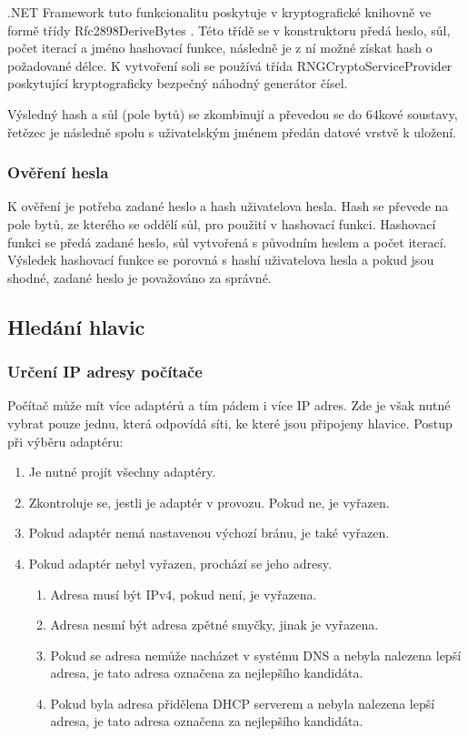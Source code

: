 \documentclass[thesis=B,czech]{FITthesis}[2012/10/20]
\begin{document}
.NET Framework tuto funkcionalitu poskytuje v kryptografické knihov\-ně ve formě třídy Rfc2898DeriveBytes \cite{rfc}. Této třídě se v konstruktoru předá heslo, sůl, počet iterací a jméno hashovací funkce, následně je z ní možné získat hash o požadované délce. K vytvoření soli se používá třída RNGCryptoServiceProvider \cite{rng} poskytující kryptograficky bezpečný náhodný generátor čísel.

Výsledný hash a sůl (pole bytů) se zkombinují a převedou se do 64kové soustavy, řetězec je následně spolu s uživatelským jménem předán datové vrstvě k uložení.


\subsubsection{Ověření hesla}

K ověření je potřeba zadané heslo a hash uživatelova hesla. Hash se převede na pole bytů, ze kterého se oddělí sůl, pro použití v hashovací funkci. Hashovací funkci se předá zadané heslo, sůl vytvořená s původním heslem a počet iterací. Výsledek hashovací funkce se porovná s hashí uživatelova hesla a pokud jsou shodné, zadané heslo je považováno za správné.

\subsection{Hledání hlavic}

\subsubsection{Určení IP adresy počítače}

Počítač může mít více adaptérů a tím pádem i více IP adres. Zde je však nutné vybrat pouze jednu, která odpovídá síti, ke které jsou připojeny hlavice. Postup při výběru adaptéru:

\begin{enumerate}
	\item Je nutné projít všechny adaptéry.
	\item Zkontroluje se, jestli je adaptér v provozu. Pokud ne, je vyřazen.
	\item Pokud adaptér nemá nastavenou výchozí bránu, je také vyřazen.
	\item Pokud adaptér nebyl vyřazen, prochází se jeho adresy.
	\begin{enumerate}
		\item Adresa musí být IPv4, pokud není, je vyřazena.
		\item Adresa nesmí být adresa zpětné smyčky, jinak je vyřazena.
		\item Pokud se adresa nemůže nacházet v systému DNS a nebyla nalezena lepší adresa, je tato adresa označena za nejlepšího kandidáta.
		\item Pokud byla adresa přidělena DHCP serverem a nebyla nalezena lepší adresa, je tato adresa označena za nejlepšího kandidáta.
	\end{enumerate}
\end{enumerate}
\end{document}
